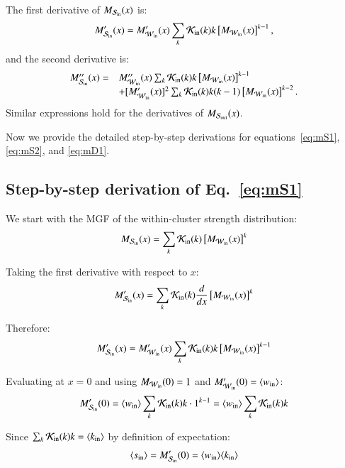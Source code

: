 \documentclass[a4paper,pre,superscriptaddress,floatfix,nofootinbib,twocolumn]{revtex4-1}
\begin{document}
The first derivative of $M_{{\cal S}_\text{in}}(x)$ is:
\[
M'_{{\cal S}_\text{in}}(x) = M'_{{\cal W}_\text{in}}(x) \sum_{k} {\cal K}_\text{in}(k) k \left[ M_{{\cal W}_\text{in}}(x) \right]^{k-1},
\]
and the second derivative is:
\[
\begin{array}{ll}
M''_{{\cal S}_\text{in}}(x) = & M''_{{\cal W}_\text{in}}(x) \sum_{k} {\cal K}_\text{in}(k) k \left[ M_{{\cal W}_\text{in}}(x) \right]^{k-1} \\
& + [M'_{{\cal W}_\text{in}}(x)]^2 \sum_{k} {\cal K}_\text{in}(k) k(k-1) \left[ M_{{\cal W}_\text{in}}(x) \right]^{k-2}.
\end{array}
\]
Similar expressions hold for the derivatives of $M_{{\cal S}_\text{out}}(x)$.

Now we provide the detailed step-by-step derivations for equations~\eqref{eq:mS1}, \eqref{eq:mS2}, and \eqref{eq:mD1}.

\subsection*{Step-by-step derivation of Eq.~\eqref{eq:mS1}}

We start with the MGF of the within-cluster strength distribution:
\[
M_{{\cal S}_\text{in}}(x) = \sum_{k} {\cal K}_\text{in}(k) \left[ M_{{\cal W}_\text{in}}(x) \right]^k
\]

Taking the first derivative with respect to $x$:
\[
M'_{{\cal S}_\text{in}}(x) = \sum_{k} {\cal K}_\text{in}(k) \frac{d}{dx}\left[ M_{{\cal W}_\text{in}}(x) \right]^k
\]


Therefore:
\[
M'_{{\cal S}_\text{in}}(x) = M'_{{\cal W}_\text{in}}(x) \sum_{k} {\cal K}_\text{in}(k) k \left[ M_{{\cal W}_\text{in}}(x) \right]^{k-1}
\]

Evaluating at $x = 0$ and using $M_{{\cal W}_\text{in}}(0) = 1$ and $M'_{{\cal W}_\text{in}}(0) = \langle w_\text{in} \rangle$:
\[
M'_{{\cal S}_\text{in}}(0) = \langle w_\text{in} \rangle \sum_{k} {\cal K}_\text{in}(k) k \cdot 1^{k-1} = \langle w_\text{in} \rangle \sum_{k} {\cal K}_\text{in}(k) k
\]

Since $\sum_{k} {\cal K}_\text{in}(k) k = \langle k_{\text{in}} \rangle$ by definition of expectation:
\[
\langle s_\text{in} \rangle = M'_{{\cal S}_\text{in}}(0) = \langle w_\text{in} \rangle \langle k_{\text{in}} \rangle
\]
\end{document}
